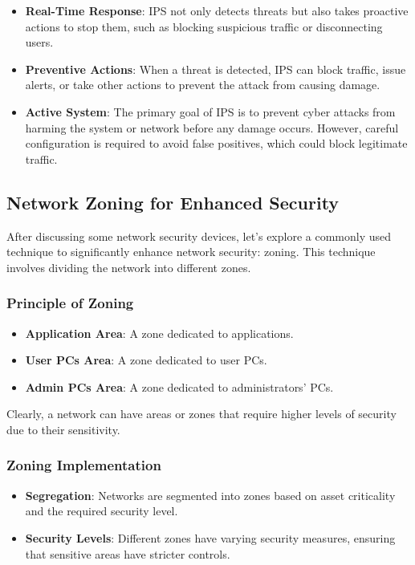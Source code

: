 \begin{itemize}
    \item \textbf{Real-Time Response}: IPS not only detects threats but also takes proactive actions to stop them, such as blocking suspicious traffic or disconnecting users.
    \item \textbf{Preventive Actions}: When a threat is detected, IPS can block traffic, issue alerts, or take other actions to prevent the attack from causing damage.
    \item \textbf{Active System}: The primary goal of IPS is to prevent cyber attacks from harming the system or network before any damage occurs. However, careful configuration is required to avoid false positives, which could block legitimate traffic.
\end{itemize}

\subsection{Network Zoning for Enhanced Security}

After discussing some network security devices, let's explore a commonly used technique to significantly enhance network security: zoning. This technique involves dividing the network into different zones.

\subsubsection{Principle of Zoning}

\begin{itemize}
    \item \textbf{Application Area}: A zone dedicated to applications.
    \item \textbf{User PCs Area}: A zone dedicated to user PCs.
    \item \textbf{Admin PCs Area}: A zone dedicated to administrators' PCs.
\end{itemize}

Clearly, a network can have areas or zones that require higher levels of security due to their sensitivity.

\subsubsection{Zoning Implementation}

\begin{itemize}
    \item \textbf{Segregation}: Networks are segmented into zones based on asset criticality and the required security level.
    \item \textbf{Security Levels}: Different zones have varying security measures, ensuring that sensitive areas have stricter controls.
\end{itemize}

